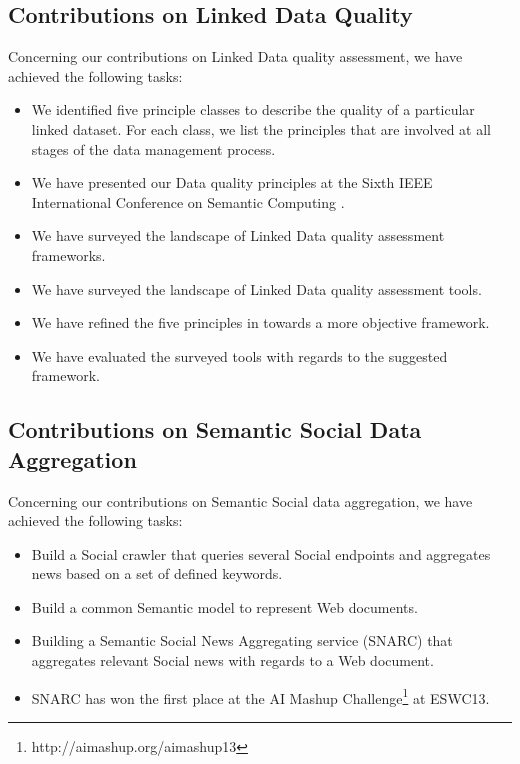 \documentclass[onecolumn, crcready]{iosart2c}
\begin{document}
\subsection{Contributions on Linked Data Quality}
Concerning our contributions on Linked Data quality assessment, we have achieved the following tasks:
\begin{itemize}
\item We identified five principle classes to describe the quality of a particular linked dataset. For each class, we list the principles that are involved at all stages of the data management process.
\item We have presented our Data quality principles at the Sixth IEEE International Conference on Semantic Computing \cite{assaf2012}.
\item We have surveyed the landscape of Linked Data quality assessment frameworks.
\item We have surveyed the landscape of Linked Data quality assessment tools.
\item We have refined the five principles in \cite{assaf2012} towards a more objective framework.
\item We have evaluated the surveyed tools with regards to the suggested framework.
\end{itemize}

\subsection{Contributions on Semantic Social Data Aggregation}
Concerning our contributions on Semantic Social data aggregation, we have achieved the following tasks:
\begin{itemize}
\item Build a Social crawler that queries several Social endpoints and aggregates news based on a set of defined keywords.
\item Build a common Semantic model to represent Web documents.
\item Building a Semantic Social News Aggregating service (SNARC) \cite{DBLP:conf/esws/AssafST13} that aggregates relevant Social news with regards to a Web document.
\item SNARC has won the first place at the AI Mashup Challenge\footnote{http://aimashup.org/aimashup13} at ESWC13.
\end{itemize}

\end{document}

